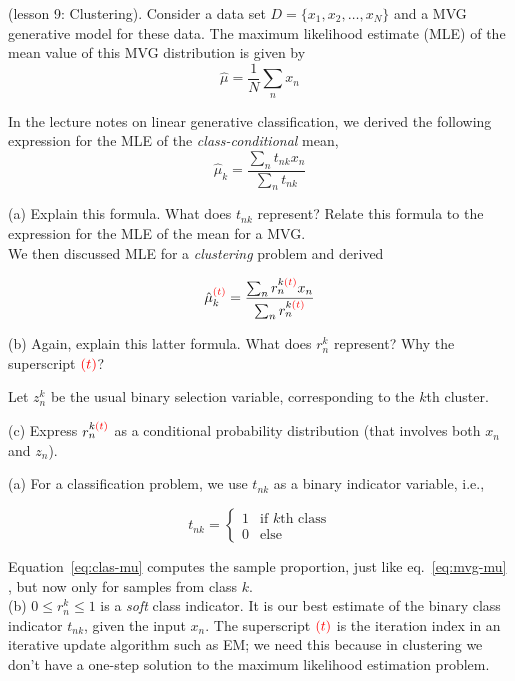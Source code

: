 \documentclass[a4paper]{article}
\def\r#1{{\color{red}#1}}
\begin{document}
\begin{ExerciseList}
\Exercise[label={ex:3}] (lesson 9: Clustering). 
 Consider a data set $D=\{x_1,x_2,\dots,x_N\}$ and a MVG generative model for these data. The maximum likelihood estimate (MLE) of the mean value of this MVG distribution is given by
\begin{equation}\hat \mu = \frac{1}{N}\sum_n x_n \label{eq:mvg-mu} \end{equation}

In the lecture notes on linear generative classification, we derived the following expression for the MLE of the \emph{class-conditional} mean,
\begin{equation}
\hat \mu_k = \frac{\sum_n t_{nk} x_n}{\sum_n t_{nk}}
\label{eq:clas-mu}
\end{equation}

(a) Explain this formula. What does $t_{nk}$ represent? Relate this formula to the expression for the MLE of the mean for a MVG.\\

We then discussed MLE for a \emph{clustering} problem and derived

\begin{equation}
\hat \mu_k^{\r{(t)}} = \frac{\sum_n r_n^{k\r{(t)}} x_n}{\sum_n r_n^{k\r{(t)}}}
\label{eq:clus-mu}
\end{equation}

(b) Again, explain this latter formula. What does $r_n^k$ represent? Why the superscript $\r{(t)}$?

\medskip
Let $z_n^k$ be the usual binary selection variable, corresponding to the $k$th cluster.

(c) Express $r_n^{k\r{(t)}}$ as a conditional probability distribution (that involves both $x_n$ and $z_n$).



\Answer[ref={ex:3}]

(a) For a classification problem, we use $t_{nk}$ as a binary indicator variable, i.e.,

 $$ t_{nk} = \begin{cases} 1 & \text{if $k$th class} \\
    0 & \text{else}
    \end{cases}$$

Equation~\ref{eq:clas-mu} computes the sample proportion, just like eq.~\ref{eq:mvg-mu} , but now only for samples from class $k$.\\

(b) $0 \leq r_n^k \leq 1$ is a \emph{soft} class indicator. It is our best estimate of the binary class indicator $t_{nk}$, given the input $x_n$. The superscript $\r{(t)}$ is the iteration index in an iterative update algorithm such as EM; we need this because in clustering we don't have a one-step solution to the maximum likelihood estimation problem.\\


\end{ExerciseList}
\end{document}
